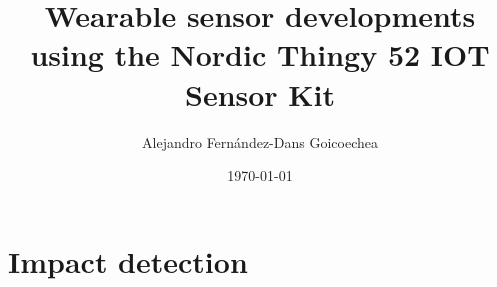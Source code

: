 \documentclass[a4paper, 11pt, twoside] {report}
\title{Wearable sensor developments using the Nordic Thingy 52 IOT Sensor Kit}
\author{Alejandro Fernández-Dans Goicoechea}
\date{\today}
\begin{document}
%	
%
%	
%
%	
%
%
	\listoffigures
	\cleardoublepage
%
%
%
%	
%
%
%	
%
%	

	\chapter{Impact detection}
	
	\cleardoublepage

%	
%
%
%
%	
%
%
%
%	
%
\end{document}
